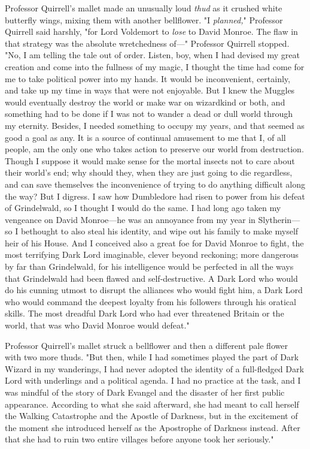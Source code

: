 Professor Quirrell's mallet made an unusually loud \emph{thud} as it crushed 
white butterfly wings, mixing them with another bellflower. "I \emph{planned,}" 
Professor Quirrell said harshly, "for Lord Voldemort to \emph{lose} to David 
Monroe. The flaw in that strategy was the absolute wretchedness of---" 
Professor Quirrell stopped. "No, I am telling the tale out of order. Listen, 
boy, when I had devised my great creation and come into the fullness of my 
magic, I thought the time had come for me to take political power into my 
hands. It would be inconvenient, certainly, and take up my time in ways that 
were not enjoyable. But I knew the Muggles would eventually destroy the world 
or make war on wizardkind or both, and something had to be done if I was not to 
wander a dead or dull world through my eternity. Besides, I needed something to 
occupy my years, and that seemed as good a goal as any. It is a source of 
continual amusement to me that I, of all people, am the only one who takes 
action to preserve our world from destruction. Though I suppose it would make 
sense for the mortal insects not to care about their world's end; why should 
they, when they are just going to die regardless, and can save themselves the 
inconvenience of trying to do anything difficult along the way? But I digress. 
I saw how Dumbledore had risen to power from his defeat of Grindelwald, so I 
thought I would do the same. I had long ago taken my vengeance on David 
Monroe---he was an annoyance from my year in Slytherin---so I bethought to also 
steal his identity, and wipe out his family to make myself heir of his House. 
And I conceived also a great foe for David Monroe to fight, the most terrifying 
Dark Lord imaginable, clever beyond reckoning; more dangerous by far than 
Grindelwald, for his intelligence would be perfected in all the ways that 
Grindelwald had been flawed and self-destructive. A Dark Lord who would do his 
cunning utmost to disrupt the alliances who would fight him, a Dark Lord who 
would command the deepest loyalty from his followers through his oratical 
skills. The most dreadful Dark Lord who had ever threatened Britain or the 
world, that was who David Monroe would defeat."

Professor Quirrell's mallet struck a bellflower and then a different pale 
flower with two more thuds. "But then, while I had sometimes played the part of 
Dark Wizard in my wanderings, I had never adopted the identity of a 
full-fledged Dark Lord with underlings and a political agenda. I had no 
practice at the task, and I was mindful of the story of Dark Evangel and the 
disaster of her first public appearance. According to what she said afterward, 
she had meant to call herself the Walking Catastrophe and the Apostle of 
Darkness, but in the excitement of the moment she introduced herself as the 
Apostrophe of Darkness instead. After that she had to ruin two entire villages 
before anyone took her seriously."

